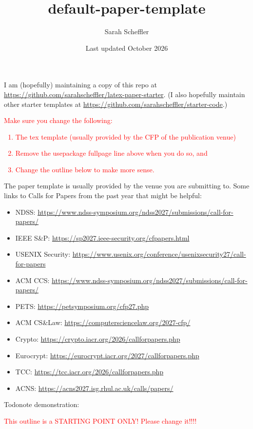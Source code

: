 \documentclass[letterpaper]{article}
\title{default-paper-template}
\author{Sarah Scheffler}
\date{Last updated October 2026}
\begin{document}
\maketitle

\begin{abstract}

\end{abstract}

I am (hopefully) maintaining a copy of this repo at \url{https://github.com/sarahscheffler/latex-paper-starter}.
(I also hopefully maintain other starter templates at \url{https://github.com/sarahscheffler/starter-code}.)

\textcolor{red}{Make sure you change the following:
\begin{enumerate}
\item The tex template (usually provided by the CFP of the publication venue)
\item Remove the usepackage fullpage line above when you do so, and 
\item Change the outline below to make more sense.
\end{enumerate}
} %

The paper template is usually provided by the venue you are submitting to.
Some links to Calls for Papers from the past year that might be helpful:
\begin{itemize}
\item NDSS: \url{https://www.ndss-symposium.org/ndss2027/submissions/call-for-papers/}
\item IEEE S\&P: \url{https://sp2027.ieee-security.org/cfpapers.html}
\item USENIX Security: \url{https://www.usenix.org/conference/usenixsecurity27/call-for-papers}
\item ACM CCS: \url{https://www.ndss-symposium.org/ndss2027/submissions/call-for-papers/}
\item PETS: \url{https://petsymposium.org/cfp27.php}
\item ACM CS\&Law: \url{https://computersciencelaw.org/2027-cfp/}
\item Crypto: \url{https://crypto.iacr.org/2026/callforpapers.php}
\item Eurocrypt: \url{https://eurocrypt.iacr.org/2027/callforpapers.php}
\item TCC: \url{https://tcc.iacr.org/2026/callforpapers.php}
\item ACNS: \url{https://acns2027.isg.rhul.ac.uk/calls/papers/}
\end{itemize}

Todonote demonstration: 

\textcolor{red}{This outline is a STARTING POINT ONLY!  Please change it!!!!}











\end{document}
